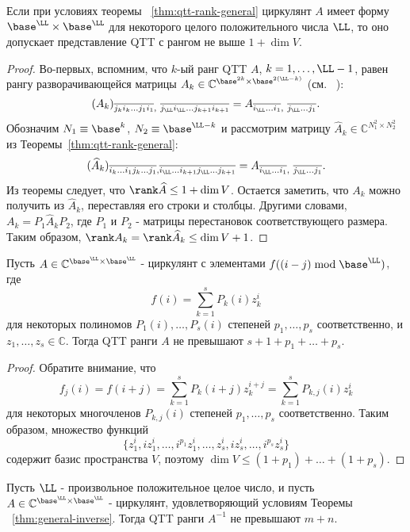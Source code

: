 \begin{corollary}
	Если при условиях теоремы ~\ref{thm:qtt-rank-general}
	циркулянт $A$ имеет форму ${\base^\LL \times \base^\LL}$ для некоторого целого положительного числа $\LL$,
	то оно допускает представление QTT с рангом не выше $1 + \dim V$.
\end{corollary}
\begin{proof}
	Во-первых, вспомним, что $k$-ый ранг QTT $A$, $k = 1,\dots,\LL-1$, равен рангу разворачивающейся матрицы $A_k \in \mathbb{C}^{\base^{2k} \times \base^{2(\LL-k)}}$ (см. ~\cite{osel-tt-2011}):
	\[
	(A_k)_{\overline{j_ki_k\dots j_1i_1},~\overline{j_{\LL}i_{\LL}\dots j_{k+1}i_{k+1}}} = A_{\overline{i_{\LL}\dots i_1},~\overline{j_{\LL}\dots j_1}}.
	\]
	Обозначим $N_1 \equiv \base^k$, $N_2 \equiv \base^{\LL-k}$ и рассмотрим матрицу $\widehat{A}_k \in \mathbb{C}^{N_1^2 \times N_2^2}$ из Теоремы~\ref{thm:qtt-rank-general}:
	\[
	(\widehat{A}_k)_{\overline{i_k\dots i_1 j_k \dots j_1}, \overline{i_\LL\dots i_{k+1} j_\LL \dots j_{k+1}}} = A_{\overline{i_{\LL}\dots i_1},~\overline{j_{\LL}\dots j_1}}.
	\]
	Из теоремы следует, что $\rank \widehat{A} \le 1 + \dim V$.
	Остается заметить, что $A_k$ можно получить из $\widehat{A}_k$, переставляя его строки и столбцы.
	Другими словами, $A_k = P_1 \widehat{A}_k P_2$, где $P_1$ и $P_2$ - матрицы перестановок соответствующего размера.
	Таким образом, $\rank A_k = \rank \widehat{A}_k \le \dim V + 1$.
\end{proof}
\begin{corollary}\label{cor:qtt-ranks-special-circulant}
	Пусть $A \in \mathbb{C}^{\base^\LL \times \base^\LL}$ - циркулянт с элементами $f((i-j) \bmod \base^\LL)$, где \[
	f(i) = \sum_{k=1}^s P_k(i) z_k^i
	\]
	для некоторых полиномов $P_1(i),\dots,P_s(i)$ степеней $p_1, \dots, p_s$ соответственно, и $z_1, \dots, z_s \in \mathbb{C}$.
	Тогда QTT ранги $A$ не превышают $s + 1 + p_1 + \dots + p_s$.
\end{corollary}
\begin{proof}
	Обратите внимание, что
	\[
	f_j(i) = f(i+j) = \sum_{k=1}^s P_k(i+j)z_k^{i+j} = \sum_{k=1}^s P_{k,j}(i)z_k^{i}
	\]
	для некоторых многочленов $P_{k,j}(i)$ степеней $p_1,\dots,p_s$ соответственно.
	Таким образом, множество функций
	\[
	\{z_1^i,iz_1^i,\dots,i^{p_1}z_1^i,\dots,z_s^i,iz_s^i,\dots, i^{p_s}z_s^i\}
	\]
	содержит базис пространства $V$, поэтому $\dim V \le (1+p_1)+\dots+(1+p_s)$.
\end{proof}
\begin{corollary}
	Пусть $\LL$ - произвольное положительное целое число, и пусть $A \in \mathbb{C}^{\base^\LL \times \base^\LL}$ - циркулянт, удовлетворяющий условиям Теоремы ~\ref{thm:general-inverse}.
	Тогда QTT ранги $A^{-1}$ не превышают $m+n$.
\end{corollary}
